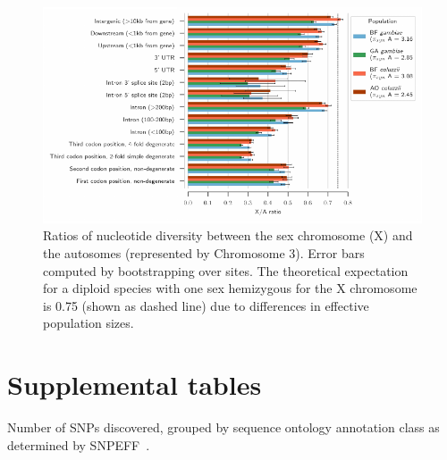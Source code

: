 \begin{refsection}
\clearpage
\begin{figure}[h]
\centering
\includegraphics[width=1.1\textwidth,center]{artwork/chapter3/feature_pi_ratios.pdf}
\caption{Ratios of nucleotide diversity between the sex chromosome (X) and the autosomes (represented by Chromosome 3).
%
Error bars computed by bootstrapping over sites.
%
The theoretical expectation for a diploid species with one sex hemizygous for the X chromosome is 0.75 (shown as dashed line) due to differences in effective population sizes.
}
%
\label{fig:ch3-feature_pi_ratios}
\end{figure}


\clearpage
\section{Supplemental tables}\label{sec:ch3-supplemental-tables}


\begin{table}[h]
\begin{center}
\begin{threeparttable}

\caption{Number of SNPs discovered, grouped by sequence ontology annotation class as determined by SNPEFF~\parencite{Cingolani2012}.}

\label{table:snpeff}


\end{threeparttable}
\end{center}
\end{table}
\end{refsection}
